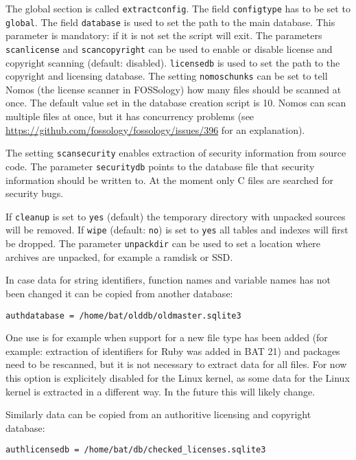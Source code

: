 \documentclass[10pt,a4paper]{article}
\begin{document}
The global section is called \texttt{extractconfig}. The field
\texttt{configtype} has to be set to \texttt{global}. The field
\texttt{database} is used to set the path to the main database. This parameter
is mandatory: if it is not set the script will exit. The parameters
\texttt{scanlicense} and \texttt{scancopyright} can be used to enable or
disable license and copyright scanning (default: disabled). \texttt{licensedb}
is used to set the path to the copyright and licensing database. The setting
\texttt{nomoschunks} can be set to tell Nomos (the license scanner in
FOSSology) how many files should be scanned at once. The default value set in
the database creation script is 10. Nomos can scan multiple files at once, but
it has concurrency problems (see
\url{https://github.com/fossology/fossology/issues/396} for an explanation).

The setting \texttt{scansecurity} enables extraction of security information
from source code. The parameter \texttt{securitydb} points to the database file
that security information should be written to. At the moment only C files are
searched for security bugs.

If \texttt{cleanup} is set to \texttt{yes} (default) the temporary directory
with unpacked sources will be removed. If \texttt{wipe} (default: \texttt{no})
is set to \texttt{yes} all tables and indexes will first be dropped. The
parameter \texttt{unpackdir} can be used to set a location where archives are
unpacked, for example a ramdisk or SSD.

In case data for string identifiers, function names and variable names has not
been changed it can be copied from another database:

\begin{verbatim}
authdatabase = /home/bat/olddb/oldmaster.sqlite3
\end{verbatim}

One use is for example when support for a new file type has been added (for
example: extraction of identifiers for Ruby was added in BAT 21) and packages
need to be rescanned, but it is not necessary to extract data for all files.
For now this option is explicitely disabled for the Linux kernel, as some data
for the Linux kernel is extracted in a different way. In the future this will
likely change.

Similarly data can be copied from an authoritive licensing and copyright
database:

\begin{verbatim}
authlicensedb = /home/bat/db/checked_licenses.sqlite3
\end{verbatim}
\end{document}
